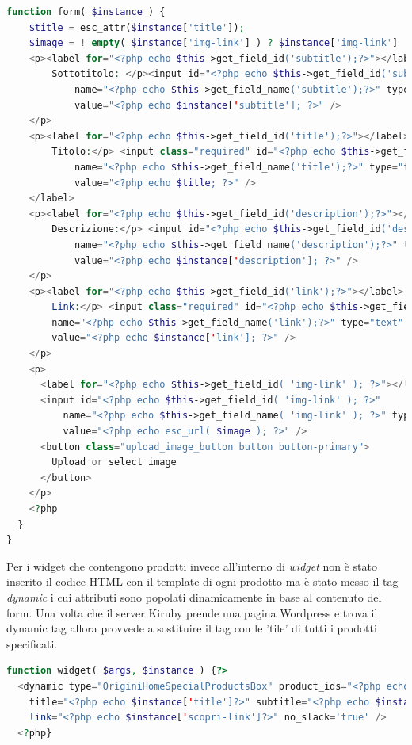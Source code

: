 \begin{lstlisting}[style=customphp, basicstyle=\tiny, language=Php,caption={Codice del widget \emph{Origini - Speciale}}]
  function form( $instance ) {
    $title = esc_attr($instance['title']);
    $image = ! empty( $instance['img-link'] ) ? $instance['img-link'] : '';?>
    <p><label for="<?php echo $this->get_field_id('subtitle');?>"></label>
        Sottotitolo: </p><input id="<?php echo $this->get_field_id('subtitle');?>" 
        	name="<?php echo $this->get_field_name('subtitle');?>" type="text" 
        	value="<?php echo $instance['subtitle']; ?>" />
    </p>
    <p><label for="<?php echo $this->get_field_id('title');?>"></label>
        Titolo:</p> <input class="required" id="<?php echo $this->get_field_id('title');?>"
        	name="<?php echo $this->get_field_name('title');?>" type="text" 
        	value="<?php echo $title; ?>" />
    </label>
    <p><label for="<?php echo $this->get_field_id('description');?>"></label>
        Descrizione:</p> <input id="<?php echo $this->get_field_id('description');?>" 
        	name="<?php echo $this->get_field_name('description');?>" type="text" 
        	value="<?php echo $instance['description']; ?>" />
    </p>
    <p><label for="<?php echo $this->get_field_id('link');?>"></label>
        Link:</p> <input class="required" id="<?php echo $this->get_field_id('link');?>" 
        name="<?php echo $this->get_field_name('link');?>" type="text" 
        value="<?php echo $instance['link']; ?>" />
    </p>
    <p>
      <label for="<?php echo $this->get_field_id( 'img-link' ); ?>"></label>
      <input id="<?php echo $this->get_field_id( 'img-link' ); ?>" 
	      name="<?php echo $this->get_field_name( 'img-link' ); ?>" type="text" 
	      value="<?php echo esc_url( $image ); ?>" />
      <button class="upload_image_button button button-primary">
      	Upload or select image
      </button>
    </p>
    <?php
  }
}
\end{lstlisting}

Per i widget che contengono prodotti invece all'interno di \emph{widget} non è stato inserito il codice HTML con il template
di ogni prodotto ma è stato messo il tag \emph{dynamic} i cui attributi sono popolati dinamicamente in base al contenuto del form.
Una volta che il server Kiruby prende una pagina Wordpress e trova il dynamic tag allora provvede a sostituire il tag con le 'tile'
di tutti i prodotti specificati.

\begin{lstlisting}[style=customphp, basicstyle=\tiny, language=Php,caption={La funzione widget di \emph{Origini - Slider prodotti} stampa il dynamic tag che verrà letto da Kiruby e sostituito con l'HTML dei prodotti}] 
function widget( $args, $instance ) {?>
  <dynamic type="OriginiHomeSpecialProductsBox" product_ids="<?php echo $instance['ids']?>" 
    title="<?php echo $instance['title']?>" subtitle="<?php echo $instance['subtitle']?>" 
    link="<?php echo $instance['scopri-link']?>" no_slack='true' />
  <?php}
\end{lstlisting}\